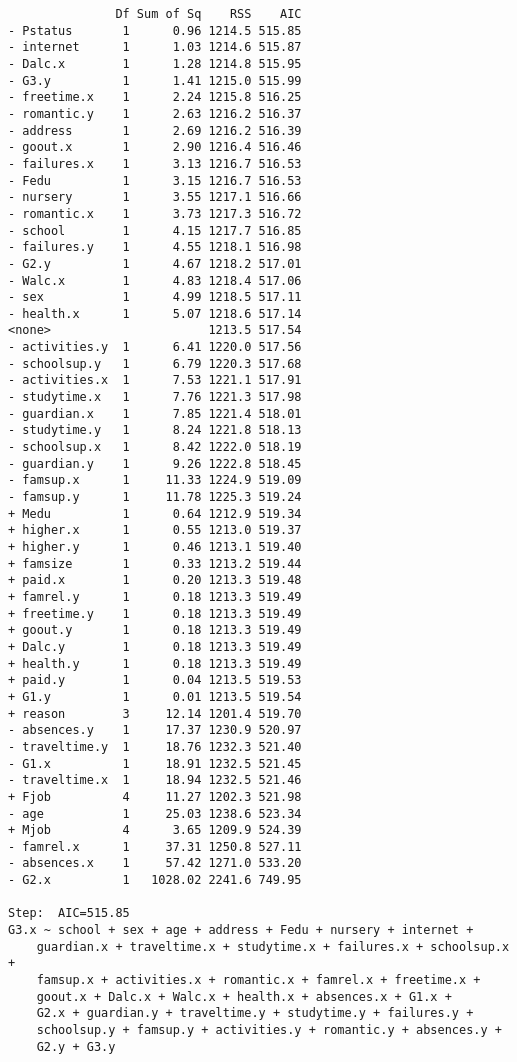 \documentclass[11pt]{article}
\begin{document}
\begin{enumerate}
\begin{verbatim}
               Df Sum of Sq    RSS    AIC
- Pstatus       1      0.96 1214.5 515.85
- internet      1      1.03 1214.6 515.87
- Dalc.x        1      1.28 1214.8 515.95
- G3.y          1      1.41 1215.0 515.99
- freetime.x    1      2.24 1215.8 516.25
- romantic.y    1      2.63 1216.2 516.37
- address       1      2.69 1216.2 516.39
- goout.x       1      2.90 1216.4 516.46
- failures.x    1      3.13 1216.7 516.53
- Fedu          1      3.15 1216.7 516.53
- nursery       1      3.55 1217.1 516.66
- romantic.x    1      3.73 1217.3 516.72
- school        1      4.15 1217.7 516.85
- failures.y    1      4.55 1218.1 516.98
- G2.y          1      4.67 1218.2 517.01
- Walc.x        1      4.83 1218.4 517.06
- sex           1      4.99 1218.5 517.11
- health.x      1      5.07 1218.6 517.14
<none>                      1213.5 517.54
- activities.y  1      6.41 1220.0 517.56
- schoolsup.y   1      6.79 1220.3 517.68
- activities.x  1      7.53 1221.1 517.91
- studytime.x   1      7.76 1221.3 517.98
- guardian.x    1      7.85 1221.4 518.01
- studytime.y   1      8.24 1221.8 518.13
- schoolsup.x   1      8.42 1222.0 518.19
- guardian.y    1      9.26 1222.8 518.45
- famsup.x      1     11.33 1224.9 519.09
- famsup.y      1     11.78 1225.3 519.24
+ Medu          1      0.64 1212.9 519.34
+ higher.x      1      0.55 1213.0 519.37
+ higher.y      1      0.46 1213.1 519.40
+ famsize       1      0.33 1213.2 519.44
+ paid.x        1      0.20 1213.3 519.48
+ famrel.y      1      0.18 1213.3 519.49
+ freetime.y    1      0.18 1213.3 519.49
+ goout.y       1      0.18 1213.3 519.49
+ Dalc.y        1      0.18 1213.3 519.49
+ health.y      1      0.18 1213.3 519.49
+ paid.y        1      0.04 1213.5 519.53
+ G1.y          1      0.01 1213.5 519.54
+ reason        3     12.14 1201.4 519.70
- absences.y    1     17.37 1230.9 520.97
- traveltime.y  1     18.76 1232.3 521.40
- G1.x          1     18.91 1232.5 521.45
- traveltime.x  1     18.94 1232.5 521.46
+ Fjob          4     11.27 1202.3 521.98
- age           1     25.03 1238.6 523.34
+ Mjob          4      3.65 1209.9 524.39
- famrel.x      1     37.31 1250.8 527.11
- absences.x    1     57.42 1271.0 533.20
- G2.x          1   1028.02 2241.6 749.95

Step:  AIC=515.85
G3.x ~ school + sex + age + address + Fedu + nursery + internet + 
    guardian.x + traveltime.x + studytime.x + failures.x + schoolsup.x + 
    famsup.x + activities.x + romantic.x + famrel.x + freetime.x + 
    goout.x + Dalc.x + Walc.x + health.x + absences.x + G1.x + 
    G2.x + guardian.y + traveltime.y + studytime.y + failures.y + 
    schoolsup.y + famsup.y + activities.y + romantic.y + absences.y + 
    G2.y + G3.y


\end{verbatim}
\end{enumerate}
\end{document}
